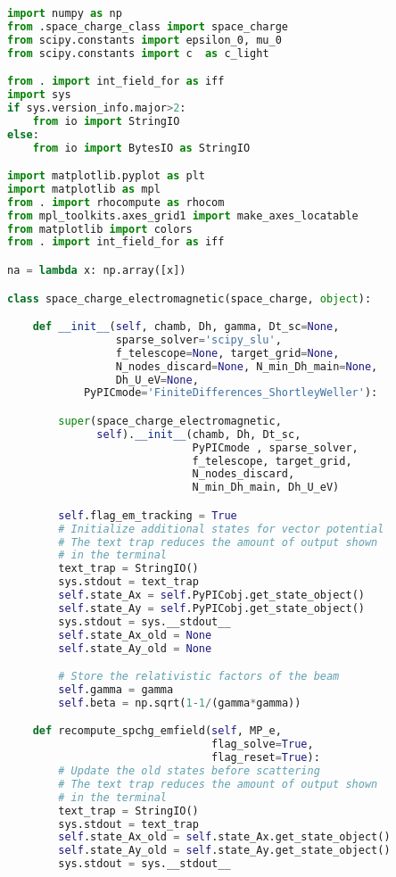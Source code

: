 \begin{lstlisting}[language=Python, basicstyle=\small,]
import numpy as np
from .space_charge_class import space_charge
from scipy.constants import epsilon_0, mu_0
from scipy.constants import c  as c_light

from . import int_field_for as iff
import sys
if sys.version_info.major>2:
    from io import StringIO
else:
    from io import BytesIO as StringIO

import matplotlib.pyplot as plt
import matplotlib as mpl
from . import rhocompute as rhocom
from mpl_toolkits.axes_grid1 import make_axes_locatable
from matplotlib import colors
from . import int_field_for as iff

na = lambda x: np.array([x])

class space_charge_electromagnetic(space_charge, object):

    def __init__(self, chamb, Dh, gamma, Dt_sc=None, 
                 sparse_solver='scipy_slu',
                 f_telescope=None, target_grid=None, 
                 N_nodes_discard=None, N_min_Dh_main=None,
                 Dh_U_eV=None,
            PyPICmode='FiniteDifferences_ShortleyWeller'):

        super(space_charge_electromagnetic, 
              self).__init__(chamb, Dh, Dt_sc, 
                             PyPICmode , sparse_solver, 
                             f_telescope, target_grid, 
                             N_nodes_discard, 
                             N_min_Dh_main, Dh_U_eV)

        self.flag_em_tracking = True
        # Initialize additional states for vector potential
        # The text trap reduces the amount of output shown 
        # in the terminal
        text_trap = StringIO()
        sys.stdout = text_trap
        self.state_Ax = self.PyPICobj.get_state_object()
        self.state_Ay = self.PyPICobj.get_state_object()
        sys.stdout = sys.__stdout__
        self.state_Ax_old = None
        self.state_Ay_old = None

        # Store the relativistic factors of the beam
        self.gamma = gamma
        self.beta = np.sqrt(1-1/(gamma*gamma))

    def recompute_spchg_emfield(self, MP_e, 
                                flag_solve=True,
                                flag_reset=True):
        # Update the old states before scattering
        # The text trap reduces the amount of output shown 
        # in the terminal
        text_trap = StringIO()
        sys.stdout = text_trap
        self.state_Ax_old = self.state_Ax.get_state_object()
        self.state_Ay_old = self.state_Ay.get_state_object()
        sys.stdout = sys.__stdout__


\end{lstlisting}
